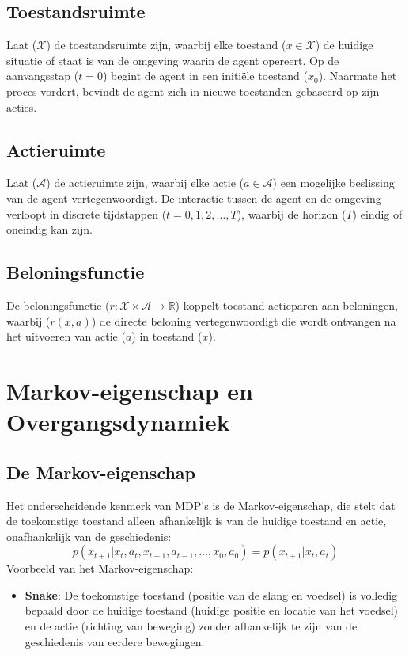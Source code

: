 \documentclass[a4paper,12pt]{report}
\begin{document}
\subsection{Toestandsruimte}
Laat (\(\mathcal{X}\)) de toestandsruimte zijn, waarbij elke toestand (\(x \in
\mathcal{X}\)) de huidige situatie of staat is van de omgeving waarin de agent
opereert. Op de aanvangsstap (\(t = 0\)) begint de agent in een initiële
toestand (\(x_0\)). Naarmate het proces vordert, bevindt de agent zich in
nieuwe toestanden gebaseerd op zijn acties.

\subsection{Actieruimte}
Laat (\(\mathcal{A}\)) de actieruimte zijn, waarbij elke actie (\(a \in
\mathcal{A}\)) een mogelijke beslissing van de agent vertegenwoordigt. De
interactie tussen de agent en de omgeving verloopt in discrete tijdstappen (\(t
= 0, 1, 2, \ldots, T\)), waarbij de horizon (\(T\)) eindig of oneindig kan
zijn.

\subsection{Beloningsfunctie}
De beloningsfunctie (\(r: \mathcal{X} \times \mathcal{A} \to \mathbb{R}\))
koppelt toestand-actieparen aan beloningen, waarbij (\(r(x,a)\)) de directe
beloning vertegenwoordigt die wordt ontvangen na het uitvoeren van actie
(\(a\)) in toestand (\(x\)).

\section{Markov-eigenschap en Overgangsdynamiek}

\subsection{De Markov-eigenschap}
Het onderscheidende kenmerk van MDP's is de Markov-eigenschap, die stelt dat de
toekomstige toestand alleen afhankelijk is van de huidige toestand en actie,
onafhankelijk van de geschiedenis:
\begin{equation}
    p(x_{t+1}|x_t,a_t,x_{t-1},a_{t-1},\ldots,x_0,a_0) = p(x_{t+1}|x_t,a_t)
\end{equation}
Voorbeeld van het Markov-eigenschap:
\begin{itemize}
    \item \textbf{Snake}: De toekomstige toestand (positie van de slang en voedsel) is volledig bepaald door de huidige toestand (huidige positie en locatie van het voedsel) en de actie (richting van beweging) zonder afhankelijk te zijn van de geschiedenis van eerdere bewegingen.
\end{itemize}
\end{document}
